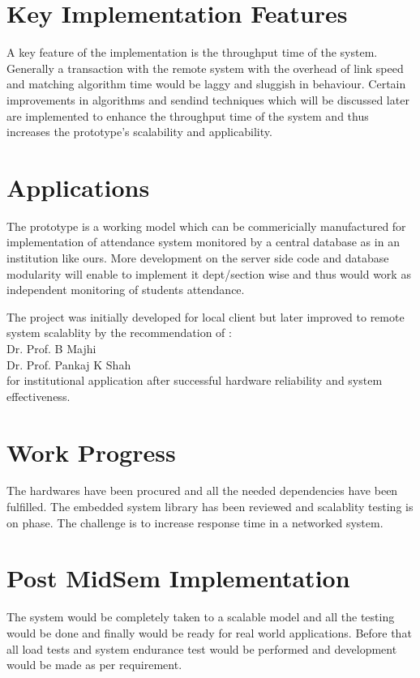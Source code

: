 \documentclass[paper=a4, fontsize=11pt]{scrartcl}
\numberwithin{equation}{section}		%
\numberwithin{figure}{section}			%
\numberwithin{table}{section}				%
\begin{document}
\section{Key Implementation Features}
\begin{paragraph}
	A key feature of the implementation is the throughput time of the system. Generally a transaction with the remote system with the overhead of link speed and matching algorithm time would be laggy and sluggish in behaviour. Certain improvements in algorithms and sendind techniques which will be discussed later are implemented to enhance the throughput time of the system and thus increases the prototype's scalability and applicability.
	
\end{paragraph}

\section{Applications}
\begin{paragraph}
	The prototype is a working model which can be commericially manufactured for implementation of attendance system monitored by a central database as in an institution like ours. More development on the server side code and database modularity will enable to implement it dept/section wise and thus would work as independent monitoring of students attendance.
    
    The project was initially developed for local client but later improved to remote system scalablity by the recommendation of :\\
    Dr. Prof. B Majhi\\
    Dr. Prof. Pankaj K Shah \\
    for institutional application after successful hardware reliability and system effectiveness.
	
\end{paragraph}
\section{Work Progress}
\begin{paragraph}
	The hardwares have been procured and all the needed dependencies have been fulfilled. The embedded system library has been reviewed and scalablity testing is on phase. The challenge is to increase response time in a networked system.
	
\end{paragraph}
\section{Post MidSem Implementation}
\begin{paragraph}
	The system would be completely taken to a scalable model and all the testing would be done and finally would be ready for real world applications. Before that all load tests and system endurance test would be performed and development would be made as per requirement.
\end{paragraph}
\end{document}

